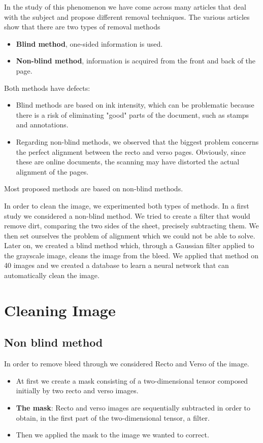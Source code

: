 \documentclass[%
 reprint,
 amsmath,amssymb,
 aps,
]{revtex4-1}
\begin{document}
In the study of this phenomenon we have come across many articles that deal with the subject and propose different removal techniques.
The various articles show that there are two types of removal methods 
\begin{itemize}
  \item \textbf{Blind method}, one-sided information is used.
  \item \textbf{Non-blind method}, information is acquired from the front and back of the page.
\end{itemize}
Both methods have defects:
\begin{itemize}
  \item Blind methods are based on ink intensity, which can be problematic because there is a risk of eliminating "good" parts of the document, such as stamps and annotations.
  \item Regarding non-blind methods, we observed that the biggest problem concerns the perfect alignment between the recto and verso pages. Obviously, since these are online documents, the scanning may have distorted the actual alignment of the pages.
\end{itemize}
Most proposed methods are based on non-blind methods.

In order to clean the image, we experimented both types of methods.
In a first study we considered a non-blind method. We tried to create a filter that would remove dirt, comparing the two sides of the sheet, precisely subtracting them.
We then set ourselves the problem of alignment which we could not be able to solve.
Later on, we created a blind method which, through a Gaussian filter applied to the grayscale image, cleans the image from the bleed. We applied that method on 40 images and we created a database to learn a neural network that can automatically clean the image.

\section{\label{sec:level2}Cleaning Image}

\subsection{\label{sec:level2}Non blind method}
In order to remove bleed through we considered Recto and Verso of the image.
\begin{itemize}
  \item At first we create a mask consisting of a two-dimensional tensor composed initially by two recto and verso images.
  \item \textbf{The mask}: Recto and verso images are sequentially subtracted in order to obtain, in the first part of the two-dimensional tensor, a filter.
  \item Then we applied the mask to the image we wanted to correct.
\end{itemize}
\end{document}
